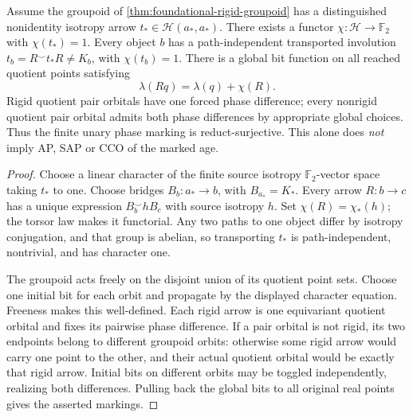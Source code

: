 \begin{theorem}
\label{thm:foundational-rigid-character}
Assume the groupoid of
\cref{thm:foundational-rigid-groupoid}
has a distinguished nonidentity isotropy arrow
$t_*\in\mathcal H(a_*,a_*)$.
There exists a functor
$\chi:\mathcal H\to\mathbb F_2$
with $\chi(t_*)=1$. Every object $b$ has a
path-independent transported involution
$t_b=R^\smile t_*R\ne K_b$, with $\chi(t_b)=1$.
There is a global bit function on all reached quotient
points satisfying
\[
       \lambda(Rq)=\lambda(q)+\chi(R).
\]
Rigid quotient pair orbitals have one forced phase
difference; every nonrigid quotient pair orbital admits
both phase differences by appropriate global choices.
Thus the finite unary phase marking is reduct-surjective.
This alone does \emph{not} imply AP, SAP or CCO of the
marked age.
\end{theorem}
\begin{proof}
Choose a linear character of the finite source isotropy
$\mathbb F_2$-vector space taking $t_*$ to one.
Choose bridges $B_b:a_*\to b$, with $B_{a_*}=K_*$.
Every arrow $R:b\to c$ has a unique expression
$B_b^\smile hB_c$ with source isotropy $h$.
Set $\chi(R)=\chi_*(h)$; the torsor law makes it
functorial. Any two paths to one object differ by
isotropy conjugation, and that group is abelian,
so transporting $t_*$ is path-independent, nontrivial,
and has character one.

The groupoid acts freely on the disjoint union of its
quotient point sets. Choose one initial bit for each
orbit and propagate by the displayed character equation.
Freeness makes this well-defined. Each rigid arrow is
one equivariant quotient orbital and fixes its pairwise
phase difference. If a pair orbital is not rigid, its
two endpoints belong to different groupoid orbits:
otherwise some rigid arrow would carry one point to
the other, and their actual quotient orbital would
be exactly that rigid arrow. Initial bits on different
orbits may be toggled independently, realizing both
differences. Pulling back the global bits to all
original real points gives the asserted markings.
\end{proof}

